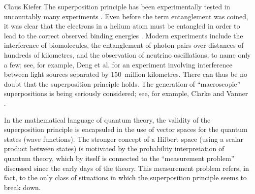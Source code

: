 \begin{artengenv}{Claus Kiefer}
The superposition principle has been experimentally tested
in uncountably many experiments \parencite{schlosshauer_decoherence:_2007,kiefer_albert_2015}.
Even before the term entanglement was coined, it was clear
that the electrons in a helium atom must be
entangled in order to lead to the correct observed binding energies 
\parencite{hylleraas_neue_1929}. Modern experiments include the interference of
biomolecules, the entanglement of photon pairs over distances of
hundreds of kilometres, and the observation of neutrino oscillations,
to name only a few; see, for example, Deng et al. \parencite*{deng_quantum_2019}
for an experiment involving interference between light sources
separated by 150~million kilometres. There can thus be no doubt that
the superposition 
principle holds. The generation of ``macroscopic'' superpositions is
being seriously considered; see, for example, Clarke and Vanner \parencite*{clarke_growing_2018}. 
 
In the mathematical language of quantum theory,
the validity of the superposition principle is encapsuled in the use
of vector spaces for the quantum states (wave functions). The stronger
concept of a Hilbert space (using a scalar product between states) is
motivated by the probability interpretation of quantum theory, which
by itself is connected to the ``measurement problem'' discussed since
the early days of the theory. This measurement problem refers, in
fact, to the only class of situations in which the superposition
principle seems to break down.


\end{artengenv}
